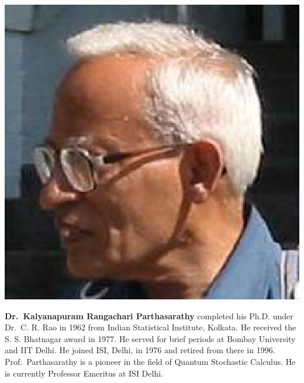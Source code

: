 \centerline{\includegraphics[scale=0.6]{authorsphotos/Prof_K_R_Parthasarathy_1.eps}}
\bigskip

\noindent
\textbf{Dr.\ Kalyanapuram Rangachari Parthasarathy} completed his Ph.D. under Dr.\ C. R. Rao in 1962 from Indian Statistical Institute, Kolkata. He received the S. S. Bhatnagar award in 1977. He served for brief periods at Bombay University and IIT Delhi. He joined ISI, Delhi, in 1976 and retired from there in 1996. Prof.\ Parthasarathy is a pioneer in the field of Quantum Stochastic Calculus. He is currently Professor Emeritus at ISI Delhi.
